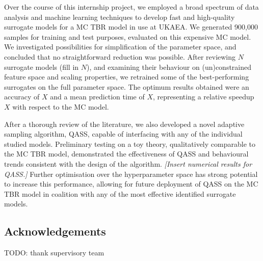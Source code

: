 Over the course of this internship project, we employed a broad spectrum of data analysis and machine learning techniques to develop fast and high-quality surrogate models for a MC TBR model in use at UKAEA. We generated 900,000 samples for training and test purposes, evaluated on this expensive MC model. We investigated possibilities for simplification of the parameter space, and concluded that no straightforward reduction was possible. After reviewing $N$ surrogate models (fill in $N$), and examining their behaviour on (un)constrained feature space and scaling properties, we retrained some of the best-performing surrogates on the full parameter space. The optimum results obtained were an accuracy of $X$ and a mean prediction time of $X$, representing a relative speedup $X$ with respect to the MC model.

After a thorough review of the literature, we also developed a novel adaptive sampling algorithm, QASS, capable of interfacing with any of the individual studied models. Preliminary testing on a toy theory, qualitatively comparable to the MC TBR model, demonstrated the effectiveness of QASS and behavioural trends consistent with the design of the algorithm. \textit{[Insert numerical results for QASS.]} Further optimisation over the hyperparameter space has strong potential to increase this performance, allowing for future deployment of QASS on the MC TBR model in coalition with any of the most effective identified surrogate models.

\subsection*{Acknowledgements}

TODO: thank supervisory team

\newpage
